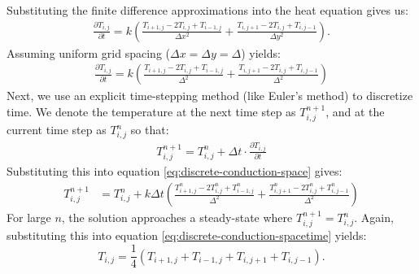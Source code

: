 \documentclass[11pt,a4paper]{article}
\begin{document}
Substituting the finite difference approximations into the heat equation gives us:
\begin{align}
  \frac{\partial T_{i,j}}{\partial t} =
  k \left( \frac{T_{i+1,j} - 2T_{i,j} +
    T_{i-1,j}}{\Delta x^2} +
  \frac{T_{i,j+1} - 2T_{i,j} + T_{i,j-1}}{\Delta y^2} \right).
\end{align}
Assuming uniform grid spacing (\( \Delta x = \Delta y = \Delta \)) yields:
\begin{align}\label{eq:discrete-conduction-space}
  \frac{\partial T_{i,j}}{\partial t} =
  k \left( \frac{T_{i+1,j} -
    2T_{i,j} + T_{i-1,j}}{\Delta^2} +
  \frac{T_{i,j+1} - 2T_{i,j} + T_{i,j-1}}{\Delta^2} \right)
\end{align}
Next,
we use an explicit time-stepping method (like Euler’s method) to discretize time.
We denote the temperature at the next time step as \(T^{n+1}_{i,j}\),
and at the current time step as \(T^n_{i,j}\) so that:
\begin{align}
  T^{n+1}_{i,j} = T^n_{i,j} +
  \Delta t \cdot \frac{\partial T_{i,j}}{\partial t}
\end{align}
Substituting this into equation \ref{eq:discrete-conduction-space} gives:
\begin{align}\label{eq:discrete-conduction-spacetime}
  T^{n+1}_{i,j} & =
  T^n_{i,j} +
  k \Delta t \left( \frac{T^{n}_{i+1,j} - 2T^{n}_{i,j} +
    T^{n}_{i-1,j}}{\Delta^2} + \frac{T^{n}_{i,j+1} - 2T^{n}_{i,j} +
    T^{n}_{i,j-1}}{\Delta^2} \right)
\end{align}
For large \(n\),
the solution approaches a steady-state where \( T^{n+1}_{i,j} = T^{n}_{i,j} \).
Again,
substituting this into equation \ref{eq:discrete-conduction-spacetime} yields:
\begin{equation}
  T_{i,j} = \frac{1}{4}\left(T_{i+1,j} + T_{i-1,j} + T_{i,j+1} + T_{i,j-1}\right).
\end{equation}
\end{document}
